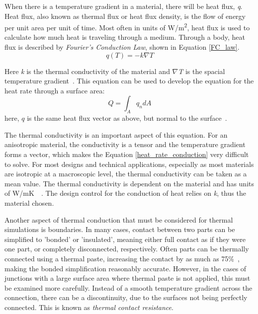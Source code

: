 When there is a temperature gradient in a material, there will be heat flux, \textit{q}. Heat flux, also known as thermal flux or heat flux density, is the flow of energy per unit area per unit of time. Most often in units of W/m\textsuperscript{2}, heat flux is used to calculate how much heat is traveling through a medium. Through a body, heat flux is described by \textit{Fourier’s Conduction Law}, shown in Equation \ref{FC_law}.
\begin{equation} \label{FC_law}
    q(T) = -k\nabla T
\end{equation}

Here \textit{k} is the thermal conductivity of the material and $\nabla$\textit{T} is the spacial temperature gradient~\citep{heat_transfer_textbook}. This equation can be used to develop the equation for the heat rate through a surface area:
\begin{equation} \label{heat_rate_conduction}
    Q = \int_{A}q_ndA
\end{equation}
here, $q$ is the same heat flux vector as above, but normal to the surface~\citep{Heat_Transfer_Basics}.

The thermal conductivity is an important aspect of this equation. For an anisotropic material, the conductivity is a tensor and the temperature gradient forms a vector, which makes the Equation \ref{heat_rate_conduction} very difficult to solve. For most designs and technical applications, especially as most materials are isotropic at a macroscopic level, the thermal conductivity can be taken as a mean value. The thermal conductivity is dependent on the material and has units of W/mK~\citep{heat_transfer_textbook}~\citep{FEA_SW}. The design control for the conduction of heat relies on \textit{k}, thus the material chosen. 

Another aspect of thermal conduction that must be considered for thermal simulations is boundaries. In many cases, contact between two parts can be simplified to 'bonded' or 'insulated', meaning either full contact as if they were one part, or completely disconnected, respectively. Often parts can be thermally connected using a thermal paste, increasing the contact by as much as 75\%~\citep{Heat_Transfer_Resistance}, making the bonded simplification reasonably accurate. However, in the cases of junctions with a large surface area where thermal paste is not applied, this must be examined more carefully. Instead of a smooth temperature gradient across the connection, there can be a discontinuity, due to the surfaces not being perfectly connected. This is known as \textit{thermal contact resistance}. 

